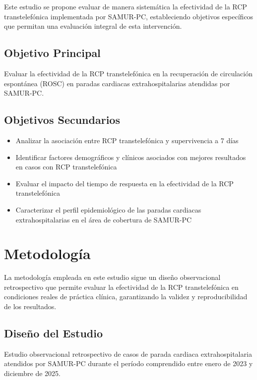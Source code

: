\documentclass[10pt,a4paper]{article}
\begin{document}
\begin{multicols}{2}
Este estudio se propone evaluar de manera sistemática la efectividad de la RCP transtelefónica implementada por SAMUR-PC, estableciendo objetivos específicos que permitan una evaluación integral de esta intervención.

\subsection{Objetivo Principal}
Evaluar la efectividad de la RCP transtelefónica en la recuperación de circulación espontánea (ROSC) en paradas cardiacas extrahospitalarias atendidas por SAMUR-PC.

\subsection{Objetivos Secundarios}
\begin{itemize}
\item Analizar la asociación entre RCP transtelefónica y supervivencia a 7 días
\item Identificar factores demográficos y clínicos asociados con mejores resultados en casos con RCP transtelefónica
\item Evaluar el impacto del tiempo de respuesta en la efectividad de la RCP transtelefónica
\item Caracterizar el perfil epidemiológico de las paradas cardiacas extrahospitalarias en el área de cobertura de SAMUR-PC
\end{itemize}

\section{Metodología}

La metodología empleada en este estudio sigue un diseño observacional retrospectivo que permite evaluar la efectividad de la RCP transtelefónica en condiciones reales de práctica clínica, garantizando la validez y reproducibilidad de los resultados.

\subsection{Diseño del Estudio}
Estudio observacional retrospectivo de casos de parada cardiaca extrahospitalaria atendidos por SAMUR-PC durante el período comprendido entre enero de 2023 y diciembre de 2025.


\end{multicols}
\end{document}
